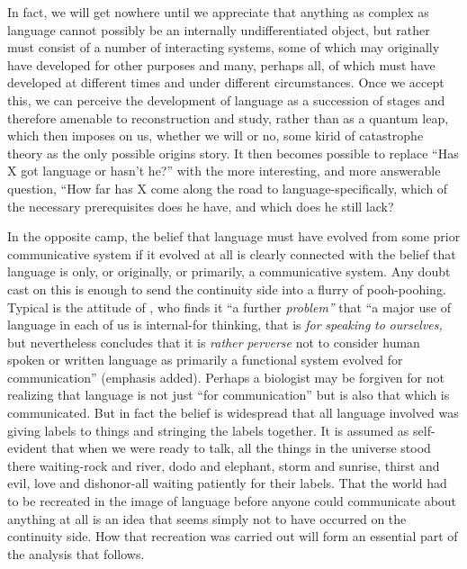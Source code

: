 In fact, we will get nowhere until we appreciate that anything as complex as language cannot possibly be an internally undifferenti\-ated object, but rather must consist of a number of interacting systems,
some of which may originally have developed for other purposes and many, perhaps all, of which must have developed at different times and under different circumstances. Once we accept this, we can per\-ceive the development of language as a succession of stages and there\-fore amenable to reconstruction and study, rather than as a quantum leap, which then imposes on us, whether we will or no, some kirid of catastrophe theory as the only possible origins story. It then becomes possible to replace ``Has X got language or hasn't he?'' with the more interesting, and more answerable question, ``How far has X come along the road to language-specifically, which of the necessary pre\-requisites does he have, and which does he still lack?{\textquotedbl}

In the opposite camp, the belief that language must have evolved from some prior communicative system if it evolved at all is clearly connected with the belief that language is only, or originally, or pri\-marily, a communicative system. Any doubt cast on this is enough to send the continuity side into a flurry of pooh-poohing. Typical is the attitude of \citet[175]{Young1978}, who finds it ``a further \textit{problem'' }that ``a major use of language in each of us is internal-for thinking, that is \textit{for} \textit{speaking} \textit{to} \textit{ourselves,{\textquotedbl}} but nevertheless concludes that it is \textit{{\textquotedbl}rather} \textit{perverse }not to consider human spoken or written language as primarily a functional system evolved for communication'' (emphasis added). Perhaps a biologist may be forgiven for not realizing that language is not just ``for communication'' but is also that which is com\-municated. But in fact the belief is widespread that all language in\-volved was giving labels to things and stringing the labels together. It is assumed as self-evident that when we were ready to talk, all the things in the universe stood there waiting-rock and river, dodo and elephant, storm and sunrise, thirst and evil, love and dishonor-all waiting patiently for their labels. That the world had to be recreated in the image of language before anyone could communicate about any\-thing at all is an idea that seems simply not to have occurred on the continuity side. How that recreation was carried out will form an essential part of the analysis that follows.

